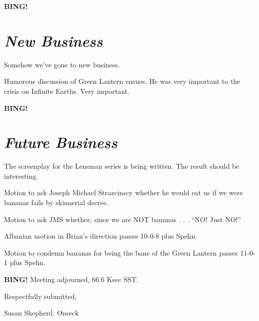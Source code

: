 \documentclass[10pt]{article}
\newcommand{\bing}{{\bf BING!} }
\newcommand{\goto}[1]{\bing \vskip 12pt \section*{{\em{#1}}}}
\newcommand{\ps}{ plus Spehn\xspace}
\begin{document}
\goto{New Business}

Somehow we've gone to new business.

Humorous discussion of Green Lantern ensues. He was very important to the crisis on Infinite Earths. Very important.

\goto{Future Business}

The screenplay for the Lensman series is being written. The result should be interesting.

Motion to ask Joseph Michael Strazcinscy whether he would eat us if we were bananas fails by skinnerial decree.

Motion to ask JMS whether, since we are NOT bananas . . . ``NO! Just NO!''

Albanian motion in Brian's direction passes 10-0-8 \ps.

Motion to condemn bananas for being the bane of the Green Lantern passes 11-0-1\ps.

\bing
\noindent
Meeting adjourned, 66.6 Ksec SST.

\vspace{18pt}

\centerline{Respectfully submitted,}
\centerline{Susan Shepherd, Onseck}
\end{document}
